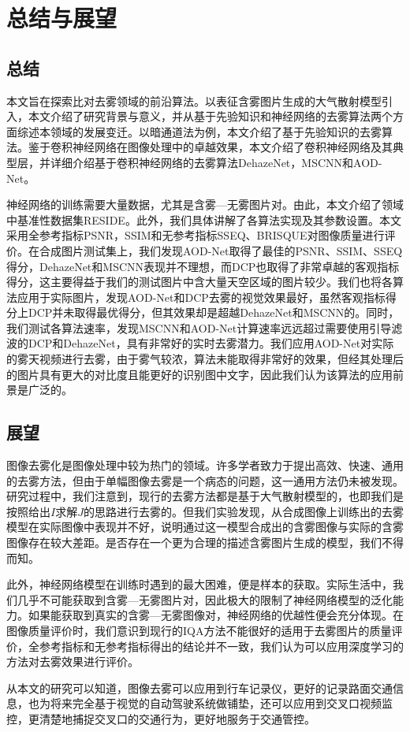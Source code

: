 \documentclass[a4paper, 12pt, oneside]{report}
\begin{document}
{\chapter{总结与展望\quad}
\section{总结\quad}
本文旨在探索比对去雾领域的前沿算法。以表征含雾图片生成的大气散射模型引入，本文介绍了研究背景与意义，并从基于先验知识和神经网络的去雾算法两个方面综述本领域的发展变迁。以暗通道法为例，本文介绍了基于先验知识的去雾算法。鉴于卷积神经网络在图像处理中的卓越效果，本文介绍了卷积神经网络及其典型层，并详细介绍基于卷积神经网络的去雾算法DehazeNet，MSCNN和AOD-Net。

神经网络的训练需要大量数据，尤其是含雾—无雾图片对。由此，本文介绍了领域中基准性数据集RESIDE。此外，我们具体讲解了各算法实现及其参数设置。本文采用全参考指标PSNR，SSIM和无参考指标SSEQ、BRISQUE对图像质量进行评价。在合成图片测试集上，我们发现AOD-Net取得了最佳的PSNR、SSIM、SSEQ得分，DehazeNet和MSCNN表现并不理想，而DCP也取得了非常卓越的客观指标得分，这主要得益于我们的测试图片中含大量天空区域的图片较少。我们也将各算法应用于实际图片，发现AOD-Net和DCP去雾的视觉效果最好，虽然客观指标得分上DCP并未取得最优得分，但其效果却是超越DehazeNet和MSCNN的。同时，我们测试各算法速率，发现MSCNN和AOD-Net计算速率远远超过需要使用引导滤波的DCP和DehazeNet，具有非常好的实时去雾潜力。我们应用AOD-Net对实际的雾天视频进行去雾，由于雾气较浓，算法未能取得非常好的效果，但经其处理后的图片具有更大的对比度且能更好的识别图中文字，因此我们认为该算法的应用前景是广泛的。
	
\section{展望\quad}
图像去雾化是图像处理中较为热门的领域。许多学者致力于提出高效、快速、通用的去雾方法，但由于单幅图像去雾是一个病态的问题，这一通用方法仍未被发现。研究过程中，我们注意到，现行的去雾方法都是基于大气散射模型的，也即我们是按照给出$I$求解$J$的思路进行去雾的。但我们实验发现，从合成图像上训练出的去雾模型在实际图像中表现并不好，说明通过这一模型合成出的含雾图像与实际的含雾图像存在较大差距。是否存在一个更为合理的描述含雾图片生成的模型，我们不得而知。

此外，神经网络模型在训练时遇到的最大困难，便是样本的获取。实际生活中，我们几乎不可能获取到含雾—无雾图片对，因此极大的限制了神经网络模型的泛化能力。如果能获取到真实的含雾—无雾图像对，神经网络的优越性便会充分体现。在图像质量评价时，我们意识到现行的IQA方法不能很好的适用于去雾图片的质量评价，全参考指标和无参考指标得出的结论并不一致，我们认为可以应用深度学习的方法对去雾效果进行评价。

从本文的研究可以知道，图像去雾可以应用到行车记录仪，更好的记录路面交通信息，也为将来完全基于视觉的自动驾驶系统做铺垫，还可以应用到交叉口视频监控，更清楚地捕捉交叉口的交通行为，更好地服务于交通管控。


} %
\end{document}
